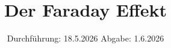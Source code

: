 

\subject{v46}
\title{Der Faraday Effekt}
\date{%
  Durchführung: 18.5.2026
  \hspace{3em}
  Abgabe: 1.6.2026
}



\maketitle
\thispagestyle{empty}
\tableofcontents
\newpage






\printbibliography{}


